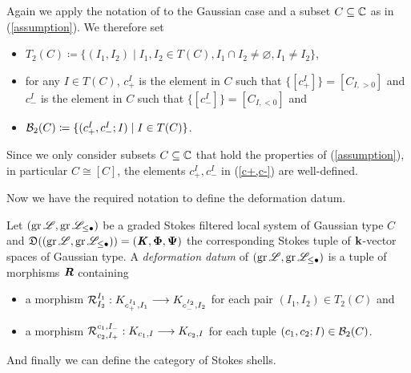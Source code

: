 \begin{nota}\label{c+,c-} Again we apply the notation of \cite{mochistokes} to the Gaussian case and a subset $C \subseteq \mathbb{C}$ as in (\ref{assumption}). We therefore set
\begin{itemize}
    \item $T_2(C) \coloneqq \{ (I_1, I_2) \mid I_1, I_2 \in T(C), I_1 \cap I_2 \neq \varnothing, I_1 \neq I_2\}$,
    \item for any $I \in T(C)$, $c^I_+$ is the element in $C$ such that  $\{[c^{I}_{+}]\} = [C_{I,>0}]$ and $c^{I}_{-}$ is the element in $C$ such that $\{[c^{I}_{-}]\} = [C_{I,<0}]$ and
    \item $\mathcal{B}_2(C) \coloneqq \{(c_+^I, c_-^I; I) \mid I \in T(C)\}$.
\end{itemize}
\end{nota}

\begin{rem}
    Since we only consider subsets $C \subseteq \mathbb{C}$ that hold the properties of (\ref{assumption}), in particular $C \cong [C]$, the elements $c_+^I, c_-^{I}$ in (\ref{c+,c-}) are well-defined. 
\end{rem}

Now we have the required notation to define the deformation datum.

\begin{defi}\label{Defo} Let $(\operatorname{gr}\mathscr{L}, \operatorname{gr}\mathscr{L}_{\leq \bullet})$ be a graded Stokes filtered local system of Gaussian type $C$ and $\mathfrak{D}((\operatorname{gr}\mathscr{L}, \operatorname{gr}\mathscr{L}_{\leq \bullet})) = (\bm{\mathit{K}}, \bm{\Phi},\bm{\Psi})$ the corresponding Stokes tuple of $\mathbf{k}$-vector spaces of Gaussian type. A \emph{deformation datum} of $(\operatorname{gr}\mathscr{L}, \operatorname{gr}\mathscr{L}_{\leq \bullet})$ is a tuple of morphisms $\bm{\mathit{R}}$ containing 
    \begin{itemize}
        \item a morphism 
        $\mathcal{R}_{I_2}^{I_1}: K_{c^{I_1}_+,I_1} \longrightarrow K_{c^{I_2}_-,I_2}$ for each pair $(I_1,I_2)\in T_2(C)$ and
    
    \item a morphism $ \mathcal{R}_{c_2, I_+}^{c_1, I_-}: K_{c_1, I} \longrightarrow K_{c_2, I}$
        for each tuple $(c_1,c_2;I) \in \mathcal{B}_2(C)$.

    \end{itemize}
\end{defi}

And finally we can define the category of Stokes shells.

